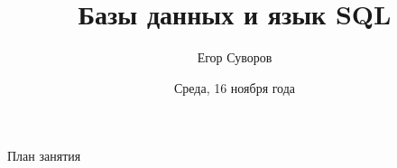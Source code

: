 \documentclass[utf8,xcolor=table]{beamer}
\title{Базы данных и язык SQL}
\author{Егор Суворов}
\institute[СПб АУ]{Курс <<Парадигмы и языки программирования>>, подгруппа 3}
\date[16.11.2016]{Среда, 16 ноября  года}
\begin{document}
\begin{frame}
\titlepage
\end{frame}

\begin{frame}{План занятия}
	\tableofcontents
\end{frame}


%
%
%
%
%
%
%
\end{document}

